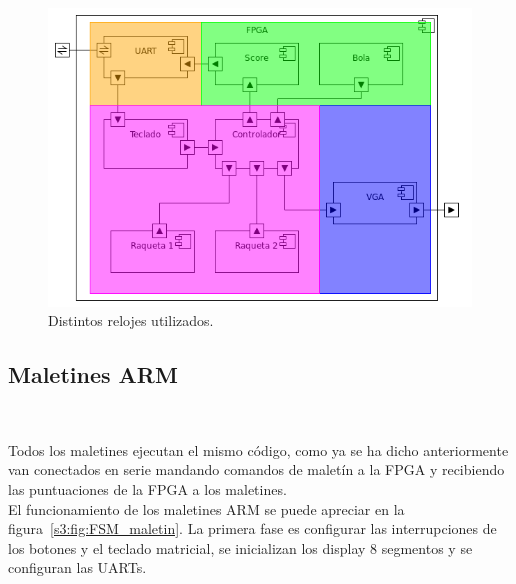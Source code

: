 \begin{figure}[h]
  \centering
  \includegraphics[width=1.0\textwidth]{images/fpga_componentes_timing_v2.png}
  \caption{Distintos relojes utilizados.}
  \label{s3:fig:componentes-fpga-clocking}
\end{figure}

\subsection{Maletines ARM}
\label{s3:subsec:maletines}
\\

Todos los maletines ejecutan el mismo código, como ya se ha dicho
anteriormente van conectados en serie mandando comandos de maletín a
la FPGA y recibiendo las puntuaciones de la FPGA a los maletines. \\

El funcionamiento de los maletines ARM se puede apreciar en la
figura~\ref{s3:fig:FSM_maletin}. La primera fase es configurar las
interrupciones de los botones y el teclado matricial, se inicializan
los display 8 segmentos y se configuran las UARTs. \\


